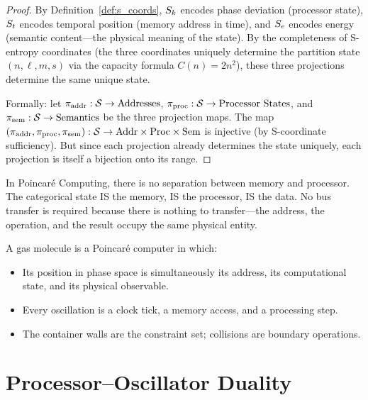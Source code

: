 \begin{proof}
By Definition~\ref{def:s_coords}, $S_k$ encodes phase deviation (processor state), $S_t$ encodes temporal position (memory address in time), and $S_e$ encodes energy (semantic content---the physical meaning of the state). By the completeness of S-entropy coordinates (the three coordinates uniquely determine the partition state $(n, \ell, m, s)$ via the capacity formula $C(n) = 2n^2$), these three projections determine the same unique state.

Formally: let $\pi_{\mathrm{addr}} : \mathcal{S} \to \text{Addresses}$, $\pi_{\mathrm{proc}} : \mathcal{S} \to \text{Processor States}$, and $\pi_{\mathrm{sem}} : \mathcal{S} \to \text{Semantics}$ be the three projection maps. The map $(\pi_{\mathrm{addr}}, \pi_{\mathrm{proc}}, \pi_{\mathrm{sem}}) : \mathcal{S} \to \text{Addr} \times \text{Proc} \times \text{Sem}$ is injective (by S-coordinate sufficiency). But since each projection already determines the state uniquely, each projection is itself a bijection onto its range.
\end{proof}

\begin{corollary}
\label{cor:von_neumann}
In Poincar\'{e} Computing, there is no separation between memory and processor. The categorical state IS the memory, IS the processor, IS the data. No bus transfer is required because there is nothing to transfer---the address, the operation, and the result occupy the same physical entity.
\end{corollary}

\begin{remark}
A gas molecule is a Poincar\'{e} computer in which:
\begin{itemize}
    \item Its position in phase space is simultaneously its address, its computational state, and its physical observable.
    \item Every oscillation is a clock tick, a memory access, and a processing step.
    \item The container walls are the constraint set; collisions are boundary operations.
\end{itemize}
\end{remark}

\section{Processor--Oscillator Duality}
\label{sec:duality}

